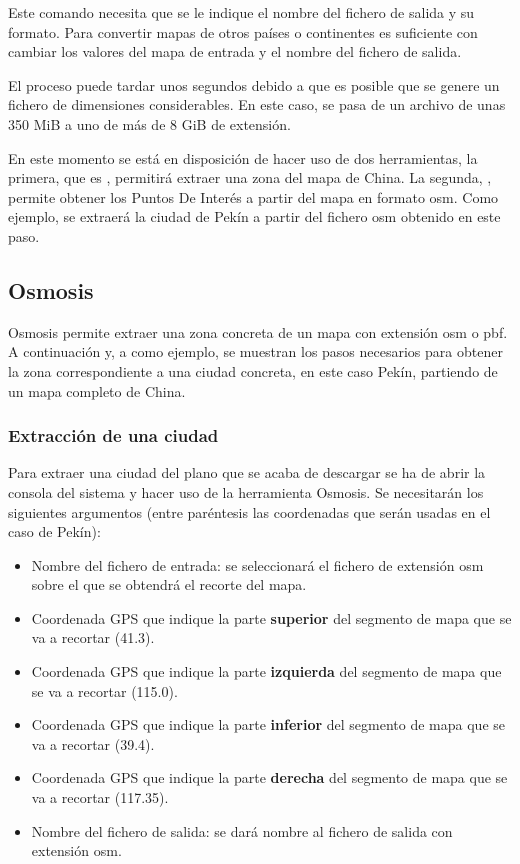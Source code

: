 Este comando necesita que se le indique el nombre del fichero de salida y su formato. Para convertir mapas de otros países o continentes es suficiente con cambiar los valores del mapa de entrada y el nombre del fichero de salida.

El proceso puede tardar unos segundos debido a que es posible que se genere un fichero de dimensiones considerables. En este caso, se pasa de un archivo de unas 350 MiB a uno de más de 8 GiB de extensión.

En este momento se está en disposición de hacer uso de dos herramientas, la primera, que es , permitirá extraer una zona del mapa de China. La segunda, , permite obtener los Puntos De Interés a partir del mapa en formato osm. Como ejemplo, se extraerá la ciudad de Pekín a partir del fichero osm obtenido en este paso.

\subsection{Osmosis}
Osmosis permite extraer una zona concreta de un mapa con extensión osm o pbf. A continuación y, a como ejemplo, se muestran los pasos necesarios para obtener la zona correspondiente a una  ciudad concreta, en este caso Pekín, partiendo de un mapa completo de China.

\subsubsection{Extracción de una ciudad}
Para extraer una ciudad del plano que se acaba de descargar se ha de abrir la consola del sistema y hacer uso de la herramienta Osmosis. Se necesitarán los siguientes argumentos (entre paréntesis las coordenadas que serán usadas en el caso de Pekín):
\begin{itemize}
	\item Nombre del fichero de entrada: se seleccionará el fichero de extensión osm sobre el que se obtendrá el recorte del mapa.
	\item Coordenada GPS que indique la parte \textbf{superior} del segmento de mapa que se va a recortar (41.3).
	\item Coordenada GPS que indique la parte \textbf{izquierda} del segmento de mapa que se va a recortar (115.0).
	\item Coordenada GPS que indique la parte \textbf{inferior} del segmento de mapa que se va a recortar (39.4).
	\item Coordenada GPS que indique la parte \textbf{derecha} del segmento de mapa que se va a recortar (117.35).
	\item Nombre del fichero de salida: se dará nombre al fichero de salida con extensión osm.
\end{itemize}

